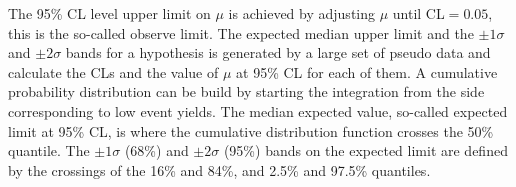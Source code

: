 The 95\% CL level upper limit on $\mu$ is achieved by adjusting $\mu$ until CL$ = 0.05$, this is the so-called observe limit. The expected median upper limit and the $\pm 1\sigma$ and $\pm 2 \sigma$ bands for a hypothesis is generated by a large set of pseudo data and calculate the CLs and the value of $\mu$ at 95\% CL for each of them. A cumulative probability distribution can be build by starting the integration from the side corresponding to low event yields. The median expected value, so-called expected limit at 95\% CL, is where the cumulative distribution function crosses the 50\% quantile. The $\pm 1 \sigma$ (68\%)  and $\pm 2\sigma$ (95\%) bands on the expected limit are defined by the crossings of the 16\% and 84\%, and 2.5\% and 97.5\% quantiles.

